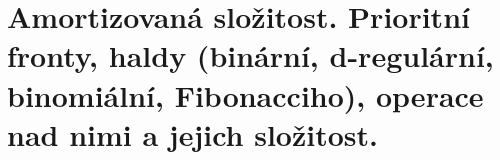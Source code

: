 \section[PAL - Složitost, fronty, haldy]{Amortizovaná složitost. Prioritní fronty, haldy (binární, d-regulární, binomiální, Fibonacciho), operace nad nimi a jejich složitost.}
